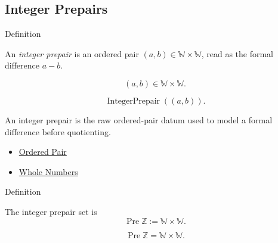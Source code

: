 \subsection*{Integer Prepairs}

\begin{definitionbox}{Definition}
\begin{definition}
\label{def:integer-prepair}
An \emph{integer prepair} is an ordered pair $(a,b)\in\mathbb{W}\times\mathbb{W}$,
read as the formal difference $a-b$.
\end{definition}
\end{definitionbox}


\begin{remark*}
\[
(a,b)\in\mathbb{W}\times\mathbb{W}.
\]
\end{remark*}

\begin{remark*}
\[
\operatorname{IntegerPrepair}((a,b)).
\]
\end{remark*}

\begin{remark*}[Interpretation]
An integer prepair is the raw ordered-pair datum used to model a formal
difference before quotienting.
\end{remark*}

\begin{dependencies}
\begin{itemize}
  \item \hyperref[def:ordered-pair]{Ordered Pair}
  \item \hyperref[def:whole-numbers]{Whole Numbers}
\end{itemize}
\end{dependencies}

\begin{definitionbox}{Definition}
\begin{definition}
\label{def:integer-prepair-set}
The integer prepair set is
\[
\operatorname{Pre}\mathbb{Z}:=\mathbb{W}\times\mathbb{W}.
\]
\end{definition}
\end{definitionbox}

\begin{remark*}
\[
\operatorname{Pre}\mathbb{Z}=\mathbb{W}\times\mathbb{W}.
\]
\end{remark*}


